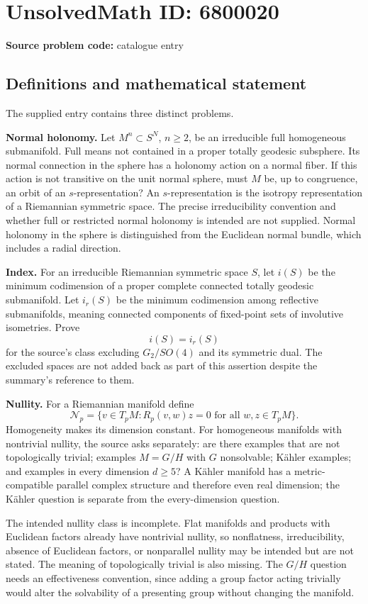 \documentclass[11pt]{article}
\begin{document}
\section*{UnsolvedMath ID: 6800020}
\textbf{Source problem code:} catalogue entry
\subsection{Definitions and mathematical statement}
The supplied entry contains three distinct problems.

\textbf{Normal holonomy.} Let $M^n\subset S^N$, $n\geq2$, be an irreducible full homogeneous submanifold. Full means not contained in a proper totally geodesic subsphere. Its normal connection in the sphere has a holonomy action on a normal fiber. If this action is not transitive on the unit normal sphere, must $M$ be, up to congruence, an orbit of an $s$-representation? An $s$-representation is the isotropy representation of a Riemannian symmetric space. The precise irreducibility convention and whether full or restricted normal holonomy is intended are not supplied. Normal holonomy in the sphere is distinguished from the Euclidean normal bundle, which includes a radial direction.

\textbf{Index.} For an irreducible Riemannian symmetric space $S$, let $i(S)$ be the minimum codimension of a proper complete connected totally geodesic submanifold. Let $i_r(S)$ be the minimum codimension among reflective submanifolds, meaning connected components of fixed-point sets of involutive isometries. Prove
\[
i(S)=i_r(S)
\]
for the source's class excluding $G_2/SO(4)$ and its symmetric dual. The excluded spaces are not added back as part of this assertion despite the summary's reference to them.

\textbf{Nullity.} For a Riemannian manifold define
\[
\mathcal N_p=\{v\in T_pM:R_p(v,w)z=0\text{ for all }w,z\in T_pM\}.
\]
Homogeneity makes its dimension constant. For homogeneous manifolds with nontrivial nullity, the source asks separately: are there examples that are not topologically trivial; examples $M=G/H$ with $G$ nonsolvable; K\"ahler examples; and examples in every dimension $d\geq5$? A K\"ahler manifold has a metric-compatible parallel complex structure and therefore even real dimension; the K\"ahler question is separate from the every-dimension question.

The intended nullity class is incomplete. Flat manifolds and products with Euclidean factors already have nontrivial nullity, so nonflatness, irreducibility, absence of Euclidean factors, or nonparallel nullity may be intended but are not stated. The meaning of topologically trivial is also missing. The $G/H$ question needs an effectiveness convention, since adding a group factor acting trivially would alter the solvability of a presenting group without changing the manifold.
\end{document}
